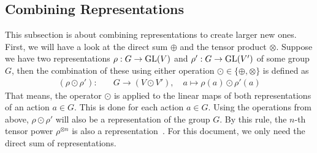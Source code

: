 \subsection{Combining Representations}

This subsection is about combining representations to create larger new ones.
First, we will have a look at the direct sum $\oplus$ and the tensor product $\otimes$.
Suppose we have two representations $\rho: G \to \operatorname{GL}(V)$ and $\rho': G \to \operatorname{GL}(V')$ of some group $G$, then the combination of these using either operation $\odot \in \{\oplus, \otimes\}$ is defined as
\begin{align*}
    (\rho \odot \rho'): \quad & G \to (V \odot V'), \quad a \mapsto \rho(a) \odot \rho'(a)
\end{align*}
That means, the operator $\odot$ is applied to the linear maps of both representations of an action $a \in G$.
This is done for each action $a \in G$.
Using the operations from above, $\rho \odot \rho'$ will also be a representation of the group $G$.
By this rule, the $n$-th tensor power $\rho^{\otimes n}$ is also a representation~\cite{fulton2013}.
For this document, we only need the direct sum of representations.
